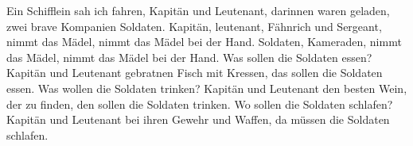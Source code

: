 \beginverse*
Ein Schifflein sah ich fahren, Kapitän und Leutenant,
darinnen waren geladen, zwei brave Kompanien Soldaten.
\endverse
\beginverse*
Kapitän, leutenant, Fähnrich und Sergeant,
nimmt das Mädel, nimmt das Mädel bei der Hand.
Soldaten, Kameraden, nimmt das Mädel,
nimmt das Mädel bei der Hand.
\endverse
\beginverse*
Was sollen die Soldaten essen? Kapitän und Leutenant
gebratnen Fisch mit Kressen, das sollen die Soldaten essen.
\endverse
\beginverse*
Was wollen die Soldaten trinken? Kapitän und Leutenant
den besten Wein, der zu finden, den sollen die Soldaten trinken.
\endverse
\beginverse*
Wo sollen die Soldaten schlafen? Kapitän und Leutenant
bei ihren Gewehr und Waffen, da müssen die Soldaten schlafen.
\endverse
\endsong